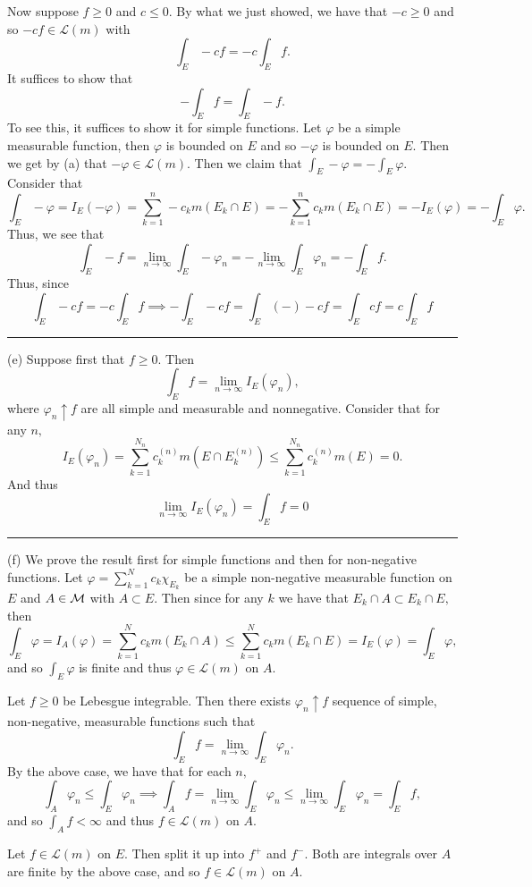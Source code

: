 \documentclass[11pt]{article}
\begin{document}
\begin{solution}
Now suppose $f\geq 0$ and $c \leq 0.$ By what we just showed,  we have that $-c \geq 0$ and so $-cf \in \mathcal{L}(m)$ with 
\[\int_E -cf = -c\int_E f.\] It suffices to show that \[-\int_E f = \int_E -f.\] To see this, it suffices to show it for simple functions. Let $\varphi$ be a simple measurable function, then $\varphi$ is bounded on $E$ and so $-\varphi$ is bounded on $E.$ Then we get by (a) that $-\varphi \in \mathcal{L}(m).$ Then we claim that $\int_E -\varphi = -\int_E \varphi.$ Consider that 
\[\int_E -\varphi = I_E(-\varphi ) = \sum_{k=1}^n -c_k m(E_k \cap E) = -\sum_{k=1}^n c_k m(E_k \cap E) = -I_E(\varphi) = -\int_E \varphi.\] Thus, we see that 
\[\int_E -f = \lim_{n\to \infty}\int_E -\varphi_n = -\lim_{n\to \infty}\int_E \varphi_n = - \int_E f.\] Thus, since 
\[\int_E -cf = -c \int_E f \implies -\int_E -cf = \int_E (-)-cf = \int_E cf = c\int_E f\]

\rule{\linewidth}{0.4pt}

(e) Suppose first that $f\geq 0.$ Then 
\[\int_E f = \lim_{n\to \infty} I_E(\varphi_n),\] where $\varphi_n \uparrow f$ are all simple and measurable and nonnegative. Consider that for any $n,$
\[I_E(\varphi_n) = \sum_{k=1}^{N_n}c^{(n)}_k m(E \cap E_k^{(n)}) \leq \sum_{k=1}^{N_n}c^{(n)}_k m(E) = 0.\] And thus 
\[\lim_{n\to \infty} I_E(\varphi_n) = \int_E f = 0\]

\rule{\linewidth}{0.4pt}

(f) We prove the result first for simple functions and then for non-negative functions. Let $\varphi = \sum_{k=1}^N c_k \chi_{E_k}$ be a simple non-negative measurable function on $E$ and $A\in \cal M$ with $A\subset E.$ Then since for any $k$ we have that $E_k \cap A \subset E_k \cap E,$ then
\[\int_E \varphi = I_A(\varphi) = \sum_{k=1}^N c_k m(E_k \cap A) \leq \sum_{k=1}^N c_k m(E_k \cap E) = I_E(\varphi) = \int_E \varphi,\] and so $\int_E \varphi$ is finite and thus $\varphi \in \mathcal{L}(m)$ on $A.$ 

Let $f \geq 0$ be Lebesgue integrable. Then there exists $\varphi_n \uparrow f$ sequence of simple, non-negative, measurable functions such that 
\[\int_E f = \lim_{n\to \infty}\int_E \varphi_n.\] By the above case, we have that for each $n,$ 
\[\int_A \varphi_n \leq \int_E \varphi_n \implies \int_A f = \lim_{n\to \infty}\int_E \varphi_n \leq \lim_{n\to \infty}\int_E \varphi_n = \int_E f,\] and so $\int_A f < \infty$ and thus $f \in \mathcal{L}(m)$ on $A.$

Let $f \in \mathcal{L}(m)$ on $E.$ Then split it up into $f^+$ and $f^-.$ Both are integrals over $A$ are finite by the above case, and so $f \in \mathcal{L}(m)$ on $A.$
\end{solution}
\end{document}
